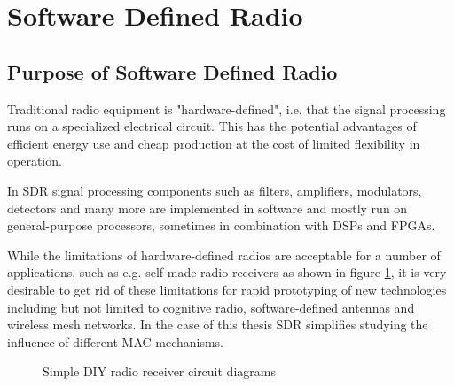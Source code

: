 \section{Software Defined Radio}
 
\subsection{Purpose of Software Defined Radio}

Traditional radio equipment is "hardware-defined", i.e. that the signal processing runs on a specialized electrical circuit. This has the potential advantages of efficient energy use and cheap production at the cost of limited flexibility in operation. 

In SDR signal processing components such as filters, amplifiers, modulators, detectors and many more are implemented in software and mostly run on general-purpose processors, sometimes in combination with DSPs and FPGAs.

While the limitations of hardware-defined radios are acceptable for a number of applications, such as e.g. self-made radio receivers as shown in figure \ref{fig:radio-receiver-circuits}, it is very desirable to get rid of these limitations for rapid prototyping of new technologies including but not limited to cognitive radio, software-defined antennas and wireless mesh networks. In the case of this thesis SDR simplifies studying the influence of different MAC mechanisms.

\begin{figure}[t]
	\label{fig:radio-receiver-circuits}
	\begin{center}
		\qquad
	\end{center}
	\caption{Simple DIY radio receiver circuit diagrams}
\end{figure}

